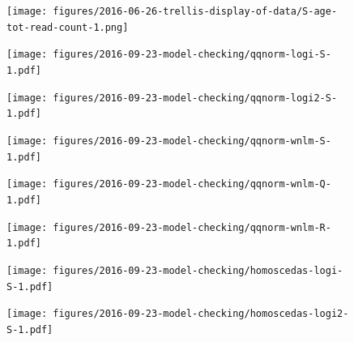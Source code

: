 \documentclass[letterpaper]{article}
\begin{document}
\begin{figure}
\begin{center}
\texttt{[image: figures/2016-06-26-trellis-display-of-data/S-age-tot-read-count-1.png]}
\end{center}
\caption{}
\label{fig:weight-of-evidence}
\end{figure}

\begin{figure}
\begin{center}
\texttt{[image: figures/2016-09-23-model-checking/qqnorm-logi-S-1.pdf]}
\end{center}
\caption{}
\label{fig:qqnorm-logi.S}
\end{figure}

\begin{figure}
\begin{center}
\texttt{[image: figures/2016-09-23-model-checking/qqnorm-logi2-S-1.pdf]}
\end{center}
\caption{}
\label{fig:qqnorm-logi2.S}
\end{figure}

\begin{figure}
\begin{center}
\texttt{[image: figures/2016-09-23-model-checking/qqnorm-wnlm-S-1.pdf]}
\end{center}
\caption{}
\label{fig:qqnorm-wnlm.S}
\end{figure}

\begin{figure}
\begin{center}
\texttt{[image: figures/2016-09-23-model-checking/qqnorm-wnlm-Q-1.pdf]}
\end{center}
\caption{}
\label{fig:qqnorm-wnlm.Q}
\end{figure}

\begin{figure}
\begin{center}
\texttt{[image: figures/2016-09-23-model-checking/qqnorm-wnlm-R-1.pdf]}
\end{center}
\caption{}
\label{fig:qqnorm-wnlm.R}
\end{figure}

\begin{figure}
\begin{center}
\texttt{[image: figures/2016-09-23-model-checking/homoscedas-logi-S-1.pdf]}
\end{center}
\caption{}
\label{fig:homoscedas-logi.S}
\end{figure}

\begin{figure}
\begin{center}
\texttt{[image: figures/2016-09-23-model-checking/homoscedas-logi2-S-1.pdf]}
\end{center}
\caption{}
\label{fig:homoscedas-logi2.S}
\end{figure}
\end{document}
